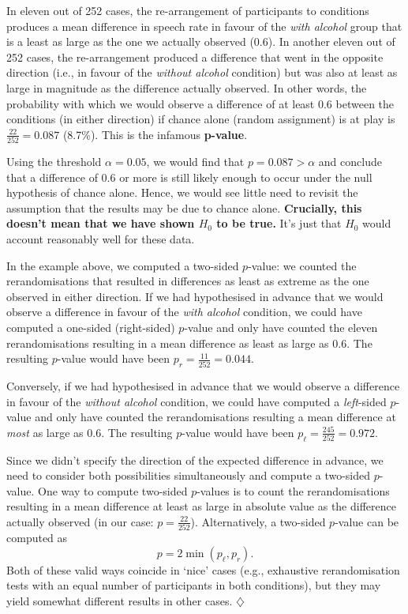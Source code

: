 \documentclass[a4paper]{tufte-book}\usepackage[]{graphicx}\usepackage[]{xcolor}
\newcommand*{\parend}[1][$\diamondsuit$]{%
\leavevmode\unskip\penalty9999 \hbox{}\nobreak\hfill
    \quad\hbox{#1}%
}
\begin{document}
In eleven out of 252 cases, the re-arrangement of participants to conditions
produces a mean difference in speech rate in favour of the \textit{with alcohol}
group that is a least as large as the one we actually observed (0.6).
In another eleven out of 252 cases, the re-arrangement produced a difference
that went in the opposite direction 
(i.e., in favour of the \textit{without alcohol} condition)
but was also at least as large in magnitude as the difference actually observed.
In other words, the probability with which we would observe
a difference of at least $0.6$ between the conditions (in either direction) 
if chance alone (random assignment) is at play is $\frac{22}{252} = 0.087$ (8.7\%).
This is the infamous \textbf{p-value}.

Using the threshold $\alpha = 0.05$,
we would find that $p = 0.087 > \alpha$ and conclude
that a difference of $0.6$ or more is still likely enough
to occur under the null hypothesis of chance alone.
Hence, we would see little need to revisit the
assumption that the results may be due to chance alone.
\textbf{Crucially, this doesn't mean that we have shown $H_0$ to be true.}
It's just that $H_0$ would account reasonably well for these data.

  In the example above, 
  we computed a two-sided $p$-value: we counted
  the rerandomisations that resulted in differences
  as least as extreme as the one observed in either direction.
  If we had hypothesised in advance that we would observe a difference
  in favour of the \textit{with alcohol} condition, we could have
  computed a one-sided (right-sided) $p$-value and only have counted
  the eleven rerandomisations resulting in a mean difference as least as large
  as $0.6$.
  The resulting $p$-value would have been $p_r = \frac{11}{252} = 0.044$.
  
  Conversely, if we had hypothesised in advance that we would observe
  a difference in favour of the \textit{without alcohol} condition, 
  we could have computed a \emph{left}-sided $p$-value and only have counted
  the rerandomisations resulting a mean difference at \emph{most} as large
  as $0.6$.
  The resulting $p$-value would have been $p_{\ell} = \frac{245}{252} = 0.972$.
  
  Since we didn't specify the direction of the expected difference in advance,
  we need to consider both possibilities simultaneously and compute a two-sided
  $p$-value.
  One way to compute two-sided $p$-values is to count the rerandomisations
  resulting in a mean difference at least as large in absolute value as 
  the difference actually observed (in our case: $p = \frac{22}{252}$).
  Alternatively, a two-sided $p$-value can be computed as
  \[
    p = 2\min(p_{\ell}, p_r).
  \]
  Both of these valid ways coincide in `nice' cases (e.g., exhaustive 
  rerandomisation tests with an equal number of participants in both conditions),
  but they may yield somewhat different results in other cases.
\parend
\end{document}
